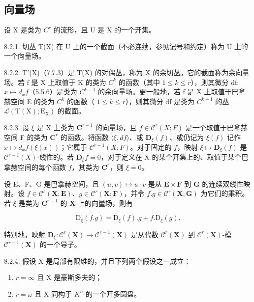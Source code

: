 \subsection{向量场}

设 X 是类为 \(C^{r}\) 的流形，且 U 是 X 的一个开集。

8.2.1. 切丛 T(X) 在 U 上的一个截面（不必连续，参见记号和约定）称为 U 上的一个向量场。

8.2.2. T'(X)（7.7.3）是 T(X) 的对偶丛，称为 X 的余切丛。它的截面称为余向量场。若 f 是 X 上取值于 K 的类为 \(C^{k}\) 的函数（其中 \(1 \leqslant k \leqslant r\)），则其微分 df: \(x \mapsto d_{x}f\)（5.5.6）是类为 \(C^{k-1}\) 的余向量场。更一般地，若 f 是 X 上取值于巴拿赫空间 E 的类为 \(C^{k}\) 的函数（ \(1 \leqslant k \leqslant r\)），则其微分 df 是类为 \(C^{k-1}\) 的丛 \(\mathcal{L}(\mathrm{T}(\mathrm{X}); \mathrm{E}_{\mathrm{X}})\) 的截面。

8.2.3. 设 \(\xi\) 是 X 上类为 \(\mathbf{C}^{r-1}\) 的向量场，且 \(f\in\mathcal{C}^{r}(X;F)\) 是一个取值于巴拿赫空间 F 的类为 \(\mathbf{C}^{r}\) 的函数。将函数 \(\langle\xi,df\rangle\)、或 \(\mathbf{D}_{\xi}(f)\)、或仍记为 \(\xi(f)\) 记作 \(x\mapsto d_{x}f(\xi(x))\)；它属于 \(\mathcal{C}^{r-1}(X;F)\)。对于固定的 \(f\)，映射 \(\xi\mapsto\mathbf{D}_{\xi}(f)\) 是 \(\mathcal{C}^{r-1}(X)\)-线性的。若 \(\mathbf{D}_{\xi}f=0\)，对于定义在 X 的某个开集上的、取值于某个巴拿赫空间的每个函数 \(f\)，其类为 \(\mathbf{C}^{r}\)，则 \(\xi=0\)。

设 E、F、G 是巴拿赫空间，且 \((u, v) \mapsto u \cdot v\) 是从 \(\mathbf{E} \times \mathbf{F}\) 到 \(\mathbf{G}\) 的连续双线性映射。设 \(f \in \mathcal{C}^r(\mathbf{X}; \mathbf{E})\)、\(g \in \mathcal{C}^r(\mathbf{X}; \mathbf{F})\)，并令 \(f.g \in \mathcal{C}^r(\mathbf{X}; \mathbf{G})\) 为它们的乘积。若 \(\xi\) 是类为 \(\mathbf{C}^{r-1}\) 的 \(\mathbf{X}\) 上的向量场，则有

\[
\mathrm{D} _ {\xi} (f. g) = \mathrm{D} _ {\xi} (f). g + f. \mathrm{D} _ {\xi} (g).
\]

特别地，映射 \(\mathbf{D}_{\xi}\colon\mathcal{C}^{r}(\mathbf{X})\to\mathcal{C}^{r-1}(\mathbf{X})\) 是从代数 \(\mathcal{C}^{r}(\mathbf{X})\) 到 \(\mathcal{C}^{r}(\mathbf{X})\)-模 \(\mathcal{C}^{r-1}(\mathbf{X})\) 的一个导子。

8.2.4. 假设 X 是局部有限维的，并且下列两个假设之一成立：

\begin{enumerate}
\def\labelenumi{(\roman{enumi})}
\item
  \(r = \infty\) 且 X 是豪斯多夫的；
\item
  \(r = \omega\) 且 X 同构于 \(K^{n}\) 的一个开多圆盘。
\end{enumerate}

